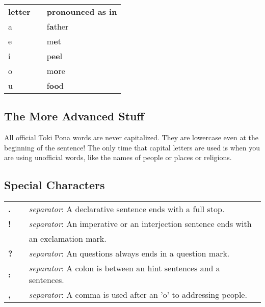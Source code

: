 \begin{supertabular}{p{2cm}|ll}
\textbf{letter}   &&    \textbf{pronounced as in} \\ %
a   &&    f\textbf{a}ther \\ %
e   &&    m\textbf{e}t    \\ %
i   &&    p\textbf{ee}l   \\ %
o   &&    m\textbf{o}re   \\ %
u   &&    f\textbf{oo}d   \\ %
\end{supertabular} 

%
\subsection*{The More Advanced Stuff}
%
All official Toki Pona words are never capitalized. 
They are lowercase even at the beginning of the sentence! 
The only time that capital letters are used is when you are using unofficial words, like the names of people or places or religions. 
%
%
\subsection*{Special Characters}
%

\begin{supertabular}{p{2cm}|ll}
\textbf{.} && \textit{separator}: A declarative sentence ends with a full stop. \\ %
\textbf{!} && \textit{separator}: An imperative or an interjection sentence ends with \\ &&  an exclamation mark. \\ %
\textbf{?} && \textit{separator}: An questions always ends in a question mark. \\ %
\textbf{:} && \textit{separator}: A colon is between an hint sentences and a sentences. \\  %
\textbf{,} && \textit{separator}: A comma is used after an 'o' to addressing people. \\ %
\end{supertabular} \\

